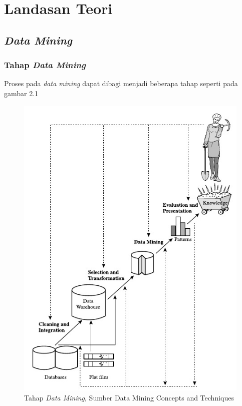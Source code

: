 \chapter{Landasan Teori}
\label{chap:definition}

\section{\textsl{Data Mining}}

\subsection{Tahap \textsl{Data Mining}}
Proses pada \textsl{data mining} dapat dibagi menjadi beberapa tahap seperti pada gambar 2.1

\begin{figure}
\includegraphics[scale=1]{Gambar/tahapdatamining.jpg}
\caption[Tahap \textsl{Data Mining}, Sumber Data Mining Concepts and Techniques]{Tahap \textsl{Data Mining}, Sumber Data Mining Concepts and Techniques} 
\end{figure}

